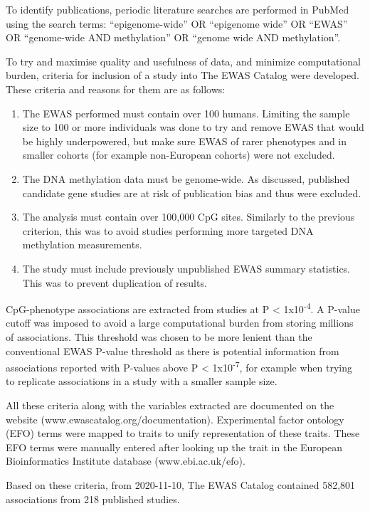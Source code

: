 \documentclass[11pt,oneside]{bristolthesis}
\providecommand{\tightlist}{%
  \setlength{\itemsep}{0pt}\setlength{\parskip}{0pt}}
\begin{document}
To identify publications, periodic literature searches are performed in PubMed using the search terms: ``epigenome-wide'' OR ``epigenome wide'' OR ``EWAS'' OR ``genome-wide AND methylation'' OR ``genome wide AND methylation''.

To try and maximise quality and usefulness of data, and minimize computational burden, criteria for inclusion of a study into The EWAS Catalog were developed. These criteria and reasons for them are as follows:
\begin{enumerate}
\def\labelenumi{\arabic{enumi}.}
\tightlist
\item
  The EWAS performed must contain over 100 humans. Limiting the sample size to 100 or more individuals was done to try and remove EWAS that would be highly underpowered, but make sure EWAS of rarer phenotypes and in smaller cohorts (for example non-European cohorts) were not excluded.
\item
  The DNA methylation data must be genome-wide. As discussed, published candidate gene studies are at risk of publication bias and thus were excluded.
\item
  The analysis must contain over 100,000 CpG sites. Similarly to the previous criterion, this was to avoid studies performing more targeted DNA methylation measurements.
\item
  The study must include previously unpublished EWAS summary statistics. This was to prevent duplication of results.
\end{enumerate}
CpG-phenotype associations are extracted from studies at P \textless{} 1x10\textsuperscript{-4}. A P-value cutoff was imposed to avoid a large computational burden from storing millions of associations. This threshold was chosen to be more lenient than the conventional EWAS P-value threshold as there is potential information from associations reported with P-values above P \textless{} 1x10\textsuperscript{-7}, for example when trying to replicate associations in a study with a smaller sample size.

All these criteria along with the variables extracted are documented on the website (www.ewascatalog.org/documentation). Experimental factor ontology (EFO) terms were mapped to traits to unify representation of these traits. These EFO terms were manually entered after looking up the trait in the European Bioinformatics Institute database (www.ebi.ac.uk/efo).

Based on these criteria, from 2020-11-10, The EWAS Catalog contained 582,801 associations from 218 published studies.
\end{document}
